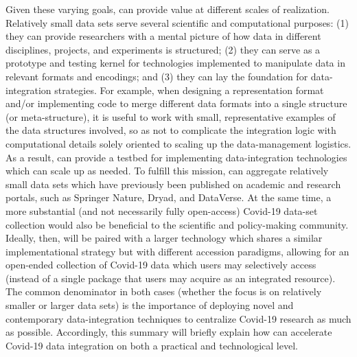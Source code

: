 \documentclass[11pt,letterpaper]{article}
\newcommand{\ATextCClr}[1]{\textcolor{atcColor}{\textbf{#1}}}
\newcommand{\CRtwo}{{\resizebox{!}{7.5pt}{\ATextCClr{CR2}}}}
\newcommand{\p}[1]{

\vspace{.8em}#1}
\begin{document}
{\p{Given these varying goals, \CRtwo{} can provide value at different 
scales of realization.  Relatively small data 
sets serve several scientific and computational 
purposes: (1) they can provide researchers 
with a mental picture of how data in different 
disciplines, projects, and experiments is structured; 
(2) they can serve as a prototype and testing 
kernel for technologies implemented to manipulate 
data in relevant formats and encodings; and 
(3) they can lay the foundation for data-integration 
strategies.  For example, when designing a 
representation format and/or implementing code 
to merge different data formats into a single 
structure (or meta-structure), it is useful 
to work with small, representative examples 
of the data structures involved, so as not 
to complicate the integration logic with 
computational details solely oriented to 
scaling up the data-management logistics.  
As a result, \CRtwo{} can provide a 
testbed for implementing data-integration 
technologies which can scale up as needed.  
To fulfill this mission, \CRtwo{} can aggregate 
relatively small data sets which have 
previously been published on academic and research 
portals, such as Springer Nature, Dryad, and DataVerse.  
At the same time, a more substantial 
(and not necessarily fully open-access) Covid-19 
data-set collection would also be beneficial to the 
scientific and policy-making community.  Ideally, then, 
\CRtwo{} will be paired with a larger technology which shares 
a similar implementational strategy but with different 
accession paradigms, allowing for an open-ended 
collection of Covid-19 data which users may 
selectively access (instead of a single package 
that users may acquire as an integrated resource).  
The common denominator in both cases 
(whether the focus is on relatively smaller or 
larger data sets) is the 
importance of deploying novel and contemporary 
data-integration techniques to centralize 
Covid-19 research as much as possible.  
Accordingly, this summary will briefly explain 
how \CRtwo{} can accelerate Covid-19 data integration 
on both a practical and technological level.}
 
}
\end{document}
